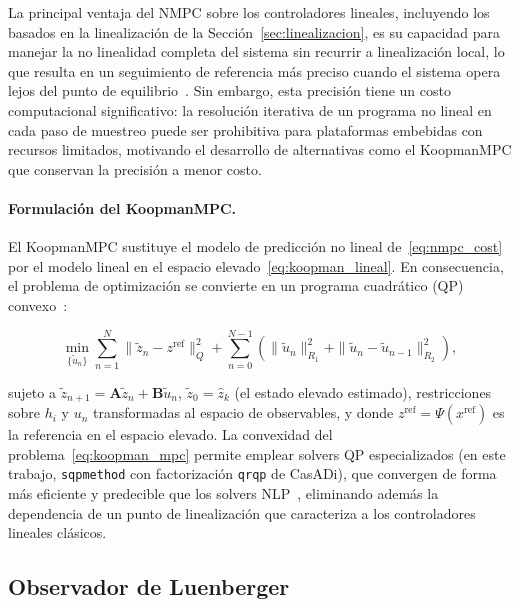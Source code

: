 \documentclass[12pt,letterpaper]{article}
\begin{document}
La principal ventaja del NMPC sobre los controladores lineales, incluyendo los
basados en la linealización de la Sección~\ref{sec:linealizacion}, es su capacidad
para manejar la no linealidad completa del sistema sin recurrir a linealización
local, lo que resulta en un seguimiento de referencia más preciso cuando el sistema
opera lejos del punto de equilibrio~\cite{rawlings2009, danai2022}. Sin embargo, esta
precisión tiene un costo computacional significativo: la resolución iterativa de un
programa no lineal en cada paso de muestreo puede ser prohibitiva para plataformas
embebidas con recursos limitados, motivando el desarrollo de alternativas como el
KoopmanMPC que conservan la precisión a menor costo.

\paragraph{Formulación del KoopmanMPC.}
El KoopmanMPC sustituye el modelo de predicción no lineal de~\eqref{eq:nmpc_cost} por
el modelo lineal en el espacio elevado~\eqref{eq:koopman_lineal}. En consecuencia, el
problema de optimización se convierte en un programa cuadrático (QP)
convexo~\cite{korda2018}:

\begin{equation}
\min_{\{\tilde{u}_n\}} \sum_{n=1}^{N} \|\tilde{z}_n - z^{\mathrm{ref}}\|_Q^2 + \sum_{n=0}^{N-1} \left( \|\tilde{u}_n\|_{R_1}^2 + \|\tilde{u}_n - \tilde{u}_{n-1}\|_{R_2}^2 \right),
\label{eq:koopman_mpc}
\end{equation}

sujeto a $\tilde{z}_{n+1} = \mathbf{A}\tilde{z}_n + \mathbf{B}\tilde{u}_n$,
$\tilde{z}_0 = \hat{z}_k$ (el estado elevado estimado), restricciones sobre $h_i$ y
$u_n$ transformadas al espacio de observables, y donde
$z^{\mathrm{ref}} = \Psi(x^{\mathrm{ref}})$ es la referencia en el espacio elevado. La
convexidad del problema~\eqref{eq:koopman_mpc} permite emplear solvers QP
especializados (en este trabajo, \texttt{sqpmethod} con factorización \texttt{qrqp}
de CasADi), que convergen de forma más eficiente y predecible que los solvers
NLP~\cite{korda2018, narasingam2019}, eliminando además la dependencia de un punto de
linealización que caracteriza a los controladores lineales clásicos.


\subsection{Observador de Luenberger}
\label{sec:luenberger}
\end{document}
